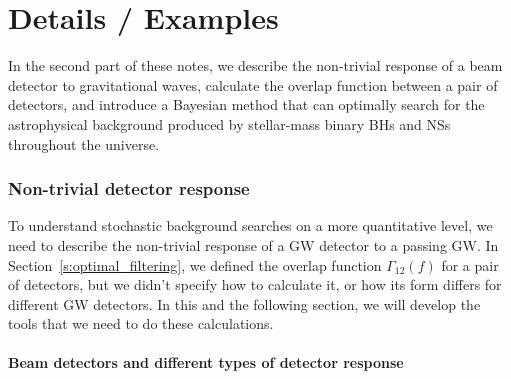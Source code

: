 \part{Details / Examples}
\label{p:details}

In the second part of these notes, 
we describe the non-trivial response of a beam
detector to gravitational waves, calculate the overlap function
between a pair of detectors, and introduce a Bayesian method that
can optimally search for the astrophysical background 
produced by stellar-mass binary BHs and NSs throughout the universe.

\section{Non-trivial detector response}
\label{s:nontrivial_response}

To understand stochastic background searches on a 
more quantitative level, we need to describe the 
non-trivial response of a GW detector to a passing GW.
In Section~\ref{s:optimal_filtering}, we defined the 
overlap function $\Gamma_{12}(f)$
for a pair of detectors, but we didn't specify how 
to calculate it, or how its form differs for different
GW detectors.
In this and the following section, we will develop
the tools that we need to do these calculations.

\subsection{Beam detectors and different types of 
detector response}

